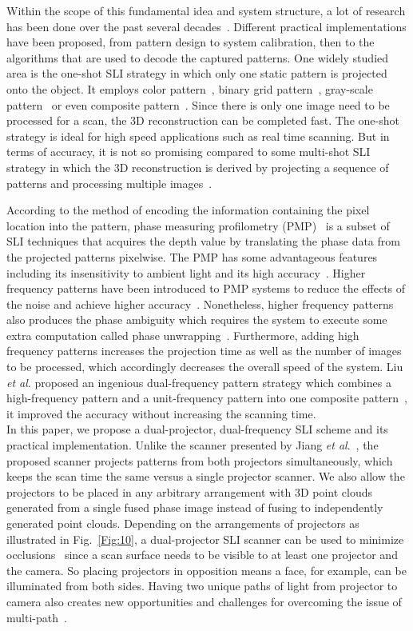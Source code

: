 \documentclass[]{spie}  %
\begin{document}
Within the scope of this fundamental idea and system structure, a lot of research has been done over the past several decades~\cite{geng11}. Different practical implementations have been proposed, from pattern design to system calibration, then to the algorithms that are used to decode the captured patterns. One widely studied area is the one-shot SLI strategy in which only one static pattern is projected onto the object. It employs color pattern~\cite{wust91}, binary grid pattern~\cite{grin92}, gray-scale pattern~\cite{durd98} or even composite pattern~\cite{guan08}. Since there is only one image need to be processed for a scan, the 3D reconstruction can be completed fast. The one-shot strategy is ideal for high speed applications such as real time scanning. But in terms of accuracy, it is not so promising compared to some multi-shot SLI strategy in which the 3D reconstruction is derived by projecting a sequence of patterns and processing multiple images~\cite{blai03}.

According to the method of encoding the information containing the pixel location into the pattern, phase measuring profilometry (PMP)~\cite{srin85} is a subset of SLI techniques that acquires the depth value by translating the phase data from the projected patterns pixelwise. The PMP has some advantageous features including its insensitivity to ambient light and its high accuracy~\cite{guan03, hali89}. Higher frequency patterns have been introduced to PMP systems to reduce the effects of the noise and achieve higher accuracy~\cite{lijl03}. Nonetheless, higher frequency patterns also produces the phase ambiguity which requires the system to execute some extra computation called phase unwrapping~\cite{song18}. Furthermore, adding high frequency patterns increases the projection time as well as the number of images to be processed, which accordingly decreases the overall speed of the system. Liu \textit{et al}. proposed an ingenious dual-frequency pattern strategy which combines a high-frequency pattern and a unit-frequency pattern into one composite pattern~\cite{liuk10}, it improved the accuracy without increasing the scanning time.
\\
In this paper, we propose a dual-projector, dual-frequency SLI scheme and its practical implementation. Unlike the scanner presented by Jiang \textit{et al}.~\cite{jian18}, the proposed scanner projects patterns from both projectors simultaneously, which keeps the scan time the same versus a single projector scanner.  We also allow the projectors to be placed in any arbitrary arrangement with 3D point clouds generated from a single fused phase image instead of fusing to independently generated point clouds. Depending on the arrangements of projectors as illustrated in Fig.~\ref{Fig:10}, a dual-projector SLI scanner can be used to minimize occlusions~\cite{linj13} since a scan surface needs to be visible to at least one projector and the camera.  So placing projectors in opposition means a face, for example, can be illuminated from both sides.  Having two unique paths of light from projector to camera also creates new opportunities and challenges for overcoming the issue of multi-path~\cite{otoo16}. 
\end{document}
